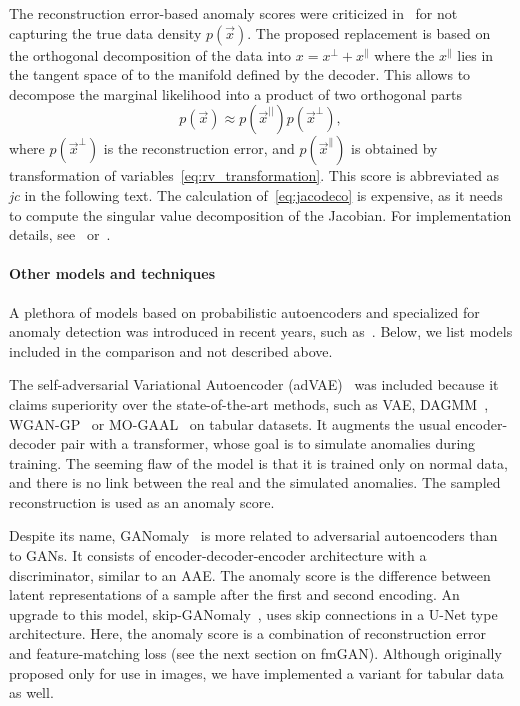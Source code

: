 The reconstruction error-based anomaly scores were criticized in~\cite{pidhorskyi2018generative}  for not capturing the true data density $p(\vec{x}).$ The proposed replacement is based on the orthogonal decomposition of the data into $x=x^\bot +x^{\parallel} $ where the $x^\parallel$  lies in the tangent space of to the manifold defined by the decoder. This allows to decompose the marginal likelihood into a product of two orthogonal parts
\begin{equation}
    p(\vec{x}) \approx p(\vec{x}^{||})p(\vec{x}^{\perp}),
\label{eq:jacodeco}
\end{equation}
where $p(\vec{x}^\bot)$ is the reconstruction error, and $p(\vec{x}^\parallel)$ is obtained by transformation of variables~\eqref{eq:rv_transformation}. This score is abbreviated as \textit{jc} in the following text. The calculation of~\eqref{eq:jacodeco} is expensive, as it needs to compute the singular value decomposition of the Jacobian. For implementation details, see~\cite{pidhorskyi2018generative} or~\cite{vsmidl2019anomaly}.

\paragraph{Other models and techniques}
 A plethora of models based on probabilistic autoencoders and specialized for anomaly detection was introduced in recent years, such as~\cite{zong2018deep, pereira2018unsupervised, xu2018unsupervised, principi2017acoustic, chen2018unsupervised, chalapathyGroupAnomalyDetection2018}. Below, we list models included in the comparison and not described above.

The self-adversarial Variational Autoencoder (adVAE)~\cite{wang2020advae} was included because it claims superiority over the state-of-the-art methods, such as VAE, DAGMM~\cite{zong2018deep}, WGAN-GP~\cite{gulrajani2017improved} or MO-GAAL~\cite{liu2019generative} on tabular datasets. It augments the usual encoder-decoder pair with a transformer, whose goal is to simulate anomalies during training. The seeming flaw of the model is that it is trained only on normal data, and there is no link between the real and the simulated anomalies. The sampled reconstruction is used as an anomaly score.

Despite its name, GANomaly~\cite{akcay2018ganomaly, ahnDeepGenerativeModelsBased2020} is more related to adversarial autoencoders than to GANs. It consists of encoder-decoder-encoder architecture with a discriminator, similar to an AAE. The anomaly score is the difference between latent representations of a sample after the first and second encoding. An upgrade to this model, skip-GANomaly~\cite{akcay2019skip}, uses skip connections in a U-Net type architecture. Here, the anomaly score is a combination of reconstruction error and feature-matching loss (see the next section on fmGAN). Although originally proposed only for use in images, we have implemented a variant for tabular data as well.  

